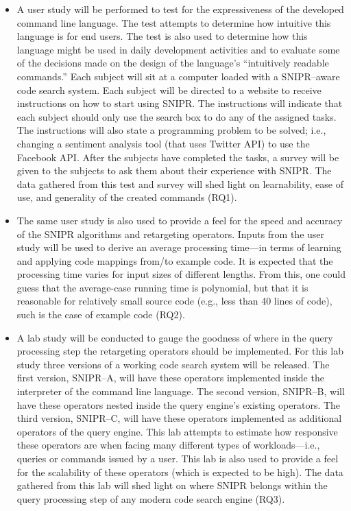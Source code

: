 \begin{itemize}  
\item A user study will be performed to test for the expressiveness of the developed command line language. The test attempts to determine how intuitive this language is for end users. The test is also used to determine how this language might be used in daily development activities and to evaluate some of the decisions made on the design of the language's ``intuitively readable commands.'' Each subject will sit at a computer loaded with a \uppercase{SnipR}--aware code search system. Each subject will be directed to a website to receive instructions on how to start using \uppercase{SnipR}. The instructions will indicate that each subject should only use the search box to do any of the assigned tasks. The instructions will also state a programming problem to be solved; i.e., changing a sentiment analysis tool (that uses Twitter API) to use the Facebook API. After the subjects have completed the tasks, a survey will be given to the subjects to ask them about their experience with \uppercase{SnipR}. The data gathered from this test and survey will shed light on learnability, ease of use, and generality of the created commands (RQ1).
\item The same user study is also used to provide a feel for the speed and accuracy of the  \uppercase{SnipR} algorithms and retargeting operators. Inputs from the user study will be used to derive an average processing time---in terms of learning and applying code mappings from/to example code. It is expected that the processing time varies for input sizes of different lengths. From this, one could guess that the average-case running time is polynomial, but that it is reasonable for relatively small source code (e.g., less than 40 lines of code), such is the case of example code (RQ2). 
\item A lab study will be conducted to gauge the goodness of where in the query processing step the retargeting operators should be implemented. For this lab study three versions of a working code search system will be released. The first version, \uppercase{SnipR}--A, will have these operators implemented inside the interpreter of the command line language. The second version, \uppercase{SnipR}--B, will have these operators nested inside the query engine's existing operators. The third version, \uppercase{SnipR}--C, will have these operators implemented as additional operators of the query engine. This lab attempts to estimate how responsive these operators are when facing many different types of workloads---i.e., queries or commands issued by a user. This lab is also used to provide a feel for the scalability of these operators (which is expected to be high). The data gathered from this lab will shed light on where \uppercase{SnipR} belongs within the query processing step of any modern code search engine (RQ3). 

\end{itemize}
